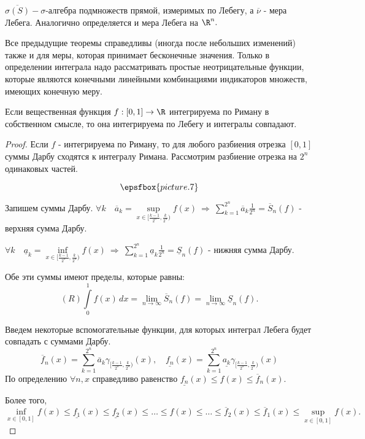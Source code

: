 \documentclass[a4paper]{article}
\newcommand{\nsb}{n\rightarrow \infty} %
\newcommand{\lin} {\lim \limits_{\nsb} }
\begin{document}
\begin{df}
$\overline{\sigma(S)} - \sigma$-алгебра подмножеств прямой,
измеримых по Лебегу, а $\overline{\nu}$ - мера Лебега. Аналогично
определяется и мера Лебега на $\R^n.$
\end{df}
Все предыдущие теоремы справедливы (иногда после небольших
изменений) также и для меры, которая принимает бесконечные
значения. Только в определении интеграла надо рассматривать
простые неотрицательные функции, которые являются конечными
линейными комбинациями индикаторов множеств, имеющих конечную
меру.
\begin{theorem}
Если вещественная функция $f: [0,1] \rightarrow\R$
интегрируема по Риману в собственном смысле, то она интегрируема
по Лебегу и интегралы совпадают.
\end{theorem}
\begin{proof}
Если $f$ - интегрируема по Риману, то для любого разбиения отрезка
$[0,1]$ суммы Дарбу сходятся к интегралу Римана. Рассмотрим
разбиение отрезка на $2^n$ одинаковых частей.

$$\epsfbox{picture.7}$$

Запишем суммы Дарбу. $\forall k \quad \overline{a}_k = \sup
\limits_{x \in [\frac{k-1}{2^n}, \frac{k}{2^n})} f(x) \
\Rightarrow \ \sum \limits_{k=1}^{2^n} \overline{a}_k
\frac{1}{2^n} = \overline{S}_n(f)$ - верхняя сумма Дарбу.

$\forall k \quad \underline{a}_k = \inf \limits_{x \in
[\frac{k-1}{2^n} , \frac{k}{2^n})} f(x) \  \Rightarrow \  \sum
\limits_{k=1}^{2^n}\underline{a}_k \frac{1}{2^n}
=\underline{S}_n(f)$ - нижняя сумма Дарбу.

Обе эти суммы имеют пределы, которые равны: $$(R) \int \limits_0^1
f(x) \, dx = \lin \overline{S}_n(f) = \lin \underline{S}_n(f).$$

Введем некоторые вспомогательные функции, для которых интеграл
Лебега будет совпадать с суммами Дарбу.
$$\overline{f}_n(x) = \sum
\limits_{k=1}^{2^n} \overline{a}_k \gamma_{[\frac{k-1}{2^n},
\frac{k}{2^n})}(x), \quad \underline{f_n}(x) =\sum
\limits_{k=1}^{2^n} \underline{a_k} \gamma_{[\frac{k-1}{2^n} ,
\frac{k}{2^n})}(x)$$ По определению $\forall n, x$ справедливо
равенство $\underline{f_n}(x) \leqslant f(x) \leqslant
\overline{f}_n(x).$

Более того, $$\inf \limits_{x \in [0,1]} f(x) \leqslant
\underline{f_1}(x) \leqslant \underline{f_2}(x) \leqslant \ldots
\leqslant f(x) \leqslant \ldots \leqslant \overline{f}_2(x)
\leqslant \overline{f}_1(x) \leqslant \sup \limits_{x \in [0,1]}
f(x).$$


\end{proof}
\end{document}
